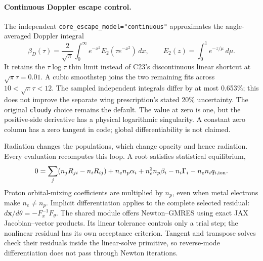 \documentclass[10pt,a4paper]{article}
\begin{document}
\paragraph{Continuous Doppler escape control.}
The independent \texttt{core\_escape\_model="continuous"} approximates the
angle-averaged Doppler integral
\begin{equation}
 \beta_D(\tau)=\frac{2}{\sqrt\pi}\int_0^\infty e^{-x^2}
 E_2(\tau e^{-x^2})\,dx,\qquad
 E_2(z)=\int_0^1 e^{-z/\mu}\,d\mu.
 \label{eq:doppler_escape}
\end{equation}
It retains the $\tau\log\tau$ thin limit instead of C23's discontinuous
linear shortcut at $\sqrt\pi\tau=0.01$. A cubic smoothstep joins the two
remaining fits across $10<\sqrt\pi\tau<12$. The sampled independent
integrals differ by at most 0.653\%; this does not improve the separate
wing prescription's stated 20\% uncertainty. The original \texttt{cloudy}
choice remains the default. The value at zero is one, but the positive-side
derivative has a physical logarithmic singularity. A constant zero column
has a zero tangent in code; global differentiability is not claimed.

Radiation changes the populations, which change opacity and hence radiation.
Every evaluation recomputes this loop. A root satisfies statistical equilibrium,
\begin{equation}
 0=\sum_j(n_jR_{ji}-n_iR_{ij})+n_en_p\alpha_i+n_e^2n_p\beta_i
       -n_i\Gamma_i-n_en_iq_{i,\rm ion}.
 \label{eq:se}
\end{equation}
Proton orbital-mixing coefficients are multiplied by $n_p$, even when metal
electrons make $n_e\ne n_p$. Implicit differentiation applies to the complete
selected residual: $d\boldsymbol{x}/d\theta=-F_x^{-1}F_\theta$.
The shared  module offers Newton--GMRES using exact
JAX Jacobian--vector products. Its linear tolerance controls only a trial
step; the nonlinear residual has its own acceptance criterion. Tangent and
transpose solves check their residuals inside the linear-solve primitive,
so reverse-mode differentiation does not pass through Newton iterations.
\end{document}
